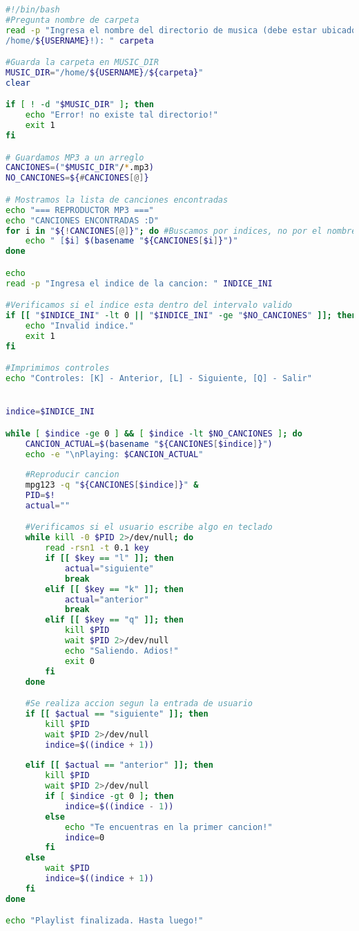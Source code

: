 \documentclass{article}
\begin{document}
\begin{lstlisting}[language=bash]
#!/bin/bash
#Pregunta nombre de carpeta
read -p "Ingresa el nombre del directorio de musica (debe estar ubicado en 
/home/${USERNAME}!): " carpeta

#Guarda la carpeta en MUSIC_DIR
MUSIC_DIR="/home/${USERNAME}/${carpeta}"
clear

if [ ! -d "$MUSIC_DIR" ]; then
    echo "Error! no existe tal directorio!"
    exit 1
fi

# Guardamos MP3 a un arreglo
CANCIONES=("$MUSIC_DIR"/*.mp3)
NO_CANCIONES=${#CANCIONES[@]}

# Mostramos la lista de canciones encontradas
echo "=== REPRODUCTOR MP3 ==="
echo "CANCIONES ENCONTRADAS :D"
for i in "${!CANCIONES[@]}"; do #Buscamos por indices, no por el nombre
    echo " [$i] $(basename "${CANCIONES[$i]}")"
done

echo
read -p "Ingresa el indice de la cancion: " INDICE_INI

#Verificamos si el indice esta dentro del intervalo valido
if [[ "$INDICE_INI" -lt 0 || "$INDICE_INI" -ge "$NO_CANCIONES" ]]; then
    echo "Invalid indice."
    exit 1
fi

#Imprimimos controles
echo "Controles: [K] - Anterior, [L] - Siguiente, [Q] - Salir"


indice=$INDICE_INI

while [ $indice -ge 0 ] && [ $indice -lt $NO_CANCIONES ]; do
    CANCION_ACTUAL=$(basename "${CANCIONES[$indice]}")
    echo -e "\nPlaying: $CANCION_ACTUAL"
    
    #Reproducir cancion
    mpg123 -q "${CANCIONES[$indice]}" &
    PID=$!
    actual=""

    #Verificamos si el usuario escribe algo en teclado
    while kill -0 $PID 2>/dev/null; do
        read -rsn1 -t 0.1 key
        if [[ $key == "l" ]]; then
            actual="siguiente"
            break
        elif [[ $key == "k" ]]; then
            actual="anterior"
            break
        elif [[ $key == "q" ]]; then
            kill $PID
            wait $PID 2>/dev/null
            echo "Saliendo. Adios!"
            exit 0
        fi
    done

    #Se realiza accion segun la entrada de usuario
    if [[ $actual == "siguiente" ]]; then
        kill $PID
        wait $PID 2>/dev/null
        indice=$((indice + 1))
        
    elif [[ $actual == "anterior" ]]; then
        kill $PID
        wait $PID 2>/dev/null
        if [ $indice -gt 0 ]; then
            indice=$((indice - 1))
        else
            echo "Te encuentras en la primer cancion!"
            indice=0
        fi
    else
        wait $PID
        indice=$((indice + 1))
    fi
done

echo "Playlist finalizada. Hasta luego!"

\end{lstlisting}
\pagebreak
\end{document}
